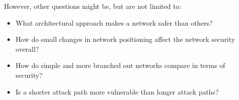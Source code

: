 However, other questions might be, but are not limited to:\\

\begin{itemize}
    \item What architectural approach makes a network safer than others?
    \item How do small changes in network positioning affect the network security overall?
    \item How do simple and more branched out networks compare in terms of security?
    \item Is a shorter attack path more vulnerable than longer attack paths?
\end{itemize}



